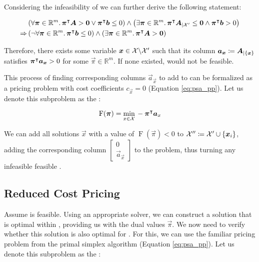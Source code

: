 Considering the infeasibility of \RMP{} we can further derive the following statement:

\begin{equation}
\begin{aligned}
& \left( \forall {\bm{\pi}} \in \mathbb{R}^m. \, {\bm{\pi}}^\intercal {\bm{A}} > {\bm{0}} \lor {\bm{\pi}}^\intercal {\bm{b}} \leq 0 \right) \land \left( \exists {\bm{\pi}} \in \mathbb{R}^m. \, {\bm{\pi}}^\intercal {\bm{A}}_{\vert \mathcal{X}'} \leq {\bm{0}} \land {\bm{\pi}}^\intercal {\bm{b}} > 0 \right) \\
\Rightarrow & \left( \neg \forall {\bm{\pi}} \in \mathbb{R}^m. \, {\bm{\pi}}^\intercal {\bm{b}} \leq 0 \right) \land \left( \exists {\bm{\pi}} \in \mathbb{R}^m. \, {\bm{\pi}}^\intercal {\bm{A}} > {\bm{0}} \right)
\end{aligned}
\end{equation}

Therefore, there exists some variable ${\bm{x}} \in \mathcal{X} \backslash \mathcal{X}'$ such that its column ${\bm{a}}_{\bm{x}} \coloneqq {\bm{A}}_{\vert \{{\bm{x}}\}}$ satisfies ${\bm{\pi}}^\intercal {\bm{a}}_{\bm{x}} > 0$ for some $\vec{\pi} \in \mathbb{R}^m$. If none existed, \MP{} would not be feasible.

This process of finding corresponding columns $\vec{a}_\vec{x}$ to add to \RMP{} can be formalized as a pricing problem with cost coefficients $c_\vec{x} = 0$ (Equation \eqref{eq:psa_pp}). Let us denote this subproblem as the \FP{}:

\begin{equation}
\operatorname{F}({\bm{\pi}}) = \underset{x \in \mathcal{X}}{\min} \, -{\bm{\pi}}^\intercal {\bm{a}}_x
\end{equation}

We can add all solutions $\vec{x}$ with a value of $\operatorname{F}(\vec{\pi}) < 0$ to $\mathcal{X}'' \coloneqq \mathcal{X}' \cup \{{\bm{x}}_i\}$, adding the corresponding column $\begin{bmatrix}0 \\ \vec{a}_\vec{x} \end{bmatrix}$ to the problem, thus turning any infeasible \RMP{} feasible \cite{thebook}.

\subsection{Reduced Cost Pricing \RCP{}}\label{sec:cg_bp_cg_reduced}
Assume \RMP{} is feasible. Using an appropriate solver, we can construct a solution that is optimal within \RMP{}, providing us with the dual values $\vec{\pi}$. We now need to verify whether this solution is also optimal for \MP{}. For this, we can use the familiar pricing problem from the primal simplex algorithm (Equation \eqref{eq:psa_pp}). Let us denote this subproblem as the \RCP{}:

